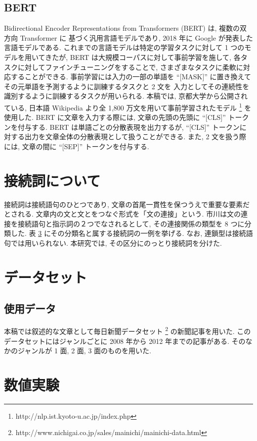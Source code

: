 \documentclass[twocolumn]{jarticle}     %
\begin{document}
\subsection{BERT}
Bidirectional Encoder Representations from Transformers (BERT)
 \cite{devlin2018bert} は, 複数の双方向 Transformer に
基づく汎用言語モデルであり, 2018 年に Google が発表した言語モデルである.
これまでの言語モデルは特定の学習タスクに対して 1 つのモデルを用いてきたが,
BERT は大規模コーパスに対して事前学習を施して, 各タスクに対してファインチューニングをすることで,
さまざまなタスクに柔軟に対応することができる.
事前学習には入力の一部の単語を ``[MASK]'' に置き換えてその元単語を予測するように訓練するタスクと 2 文を
入力としてその連続性を識別するように訓練するタスクが用いられる.
本稿では, 京都大学から公開されている, 
日本語 Wikipedia より全 1,800 万文を用いて事前学習されたモデル
\footnote{http:\slash\slash{}nlp.ist.kyoto-u.ac.jp\slash{}index.php}
を使用した.
BERT に文章を入力する際には, 文章の先頭の先頭に ``[CLS]'' トークンを付与する.
BERT は単語ごとの分散表現を出力するが, 
``[CLS]'' トークンに対する出力を文章全体の分散表現として扱うことができる.
また, 2 文を扱う際には, 文章の間に ``[SEP]'' トークンを付与する.

\section{接続詞について}
接続詞は接続語句のひとつであり, 文章の首尾一貫性を保つうえで重要な要素だとされる. 
文章内の文と文とをつなぐ形式を「文の連接」という. 
市川は文の連接を接続語句と指示詞の２つでなされるとして, その連接関係の類型を 8 つに分類した. 
表 \ref{} にその分類名と属する接続詞の一例を挙げる. 
なお, 連鎖型は接続語句では用いられない. 
本研究では, その区分にのっとり接続詞を分けた. 


\section{データセット}
\subsection{使用データ}
本稿では叙述的な文章として毎日新聞データセット 
\footnote{http:\slash\slash{}www.nichigai.co.jp\slash{}sales\slash{}mainichi\slash{}mainichi-data.html}
の新聞記事を用いた. 
このデータセットにはジャンルごとに 2008 年から 2012 年までの記事がある. 
そのなかのジャンルが 1 面, 2 面, 3 面のものを用いた. 

\section{数値実験}
\end{document}
